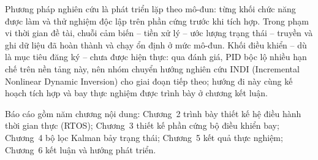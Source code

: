 Phương pháp nghiên cứu là phát triển lặp theo mô-đun: từng khối chức năng được làm và thử nghiệm độc lập trên phần cứng trước khi tích hợp. Trong phạm vi thời gian đề tài, chuỗi cảm biến -- tiền xử lý -- ước lượng trạng thái -- truyền và ghi dữ liệu đã hoàn thành và chạy ổn định ở mức mô-đun. Khối điều khiển -- dù là mục tiêu đăng ký -- chưa được hiện thực: qua đánh giá, PID bộc lộ nhiều hạn chế trên nền tảng này, nên nhóm chuyển hướng nghiên cứu INDI (Incremental Nonlinear Dynamic Inversion) cho giai đoạn tiếp theo; hướng đi này cùng kế hoạch tích hợp và bay thực nghiệm được trình bày ở chương kết luận.

Báo cáo gồm năm chương nội dung: Chương~2 trình bày thiết kế hệ điều hành thời gian thực (RTOS); Chương~3 thiết kế phần cứng bộ điều khiển bay; Chương~4 bộ lọc Kalman bảy trạng thái; Chương~5 kết quả thực nghiệm; Chương~6 kết luận và hướng phát triển.
